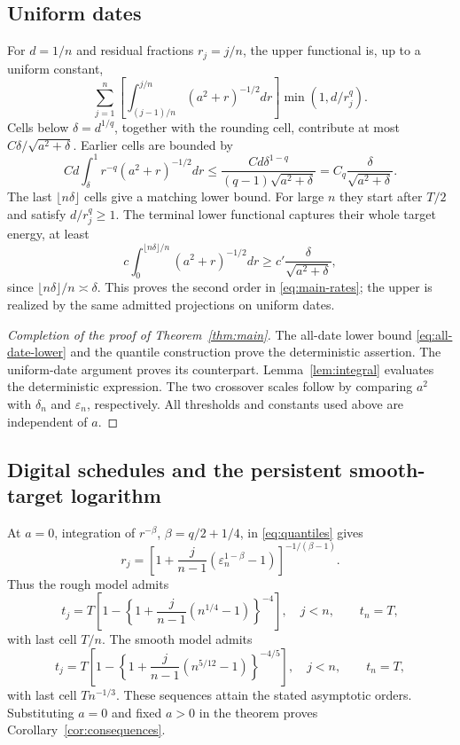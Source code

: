 \documentclass[11pt,a4paper]{amsart}
\theoremstyle{plain}
\theoremstyle{definition}
\theoremstyle{remark}
\newcommand{\eps}{\varepsilon}
\begin{document}
\subsection{Uniform dates}
For $d=1/n$ and residual fractions $r_j=j/n$, the upper functional is, up to a uniform constant,
\begin{equation}\label{eq:uniform-functional}
 \sum_{j=1}^n\left[\int_{(j-1)/n}^{j/n}(a^2+r)^{-1/2}dr\right]
                  \min(1,d/r_j^q).
\end{equation}
Cells below $\delta=d^{1/q}$, together with the rounding cell, contribute at most $C\delta/\sqrt{a^2+\delta}$. Earlier cells are bounded by
\[
 Cd\int_\delta^1r^{-q}(a^2+r)^{-1/2}dr
 \le\frac{Cd\delta^{1-q}}{(q-1)\sqrt{a^2+\delta}}
 =C_q\frac{\delta}{\sqrt{a^2+\delta}}.
\]
The last $\lfloor n\delta\rfloor$ cells give a matching lower bound. For large $n$ they start after $T/2$ and satisfy $d/r_j^q\ge1$. The terminal lower functional captures their whole target energy, at least
\[
 c\int_0^{\lfloor n\delta\rfloor/n}(a^2+r)^{-1/2}dr
 \ge c'\frac{\delta}{\sqrt{a^2+\delta}},
\]
since $\lfloor n\delta\rfloor/n\asymp\delta$. This proves the second order in \eqref{eq:main-rates}; the upper is realized by the same admitted projections on uniform dates.

\begin{proof}[Completion of the proof of Theorem~\ref{thm:main}]
The all-date lower bound \eqref{eq:all-date-lower} and the quantile construction prove the deterministic assertion. The uniform-date argument proves its counterpart. Lemma~\ref{lem:integral} evaluates the deterministic expression. The two crossover scales follow by comparing $a^2$ with $\delta_n$ and $\eps_n$, respectively. All thresholds and constants used above are independent of $a$.
\end{proof}

\subsection{Digital schedules and the persistent smooth-target logarithm}
At $a=0$, integration of $r^{-\beta}$, $\beta=q/2+1/4$, in \eqref{eq:quantiles} gives
\begin{equation}\label{eq:digital-quantiles}
 r_j=\left[1+\frac{j}{n-1}(\eps_n^{1-\beta}-1)\right]^{-1/(\beta-1)}.
\end{equation}
Thus the rough model admits
\[
 t_j=T\left[1-\left\{1+\frac{j}{n-1}(n^{1/4}-1)\right\}^{-4}\right],
 \quad j<n,\qquad t_n=T,
\]
with last cell $T/n$. The smooth model admits
\[
 t_j=T\left[1-\left\{1+\frac{j}{n-1}(n^{5/12}-1)\right\}^{-4/5}\right],
 \quad j<n,\qquad t_n=T,
\]
with last cell $Tn^{-1/3}$. These sequences attain the stated asymptotic orders. Substituting $a=0$ and fixed $a>0$ in the theorem proves Corollary~\ref{cor:consequences}.
\end{document}
